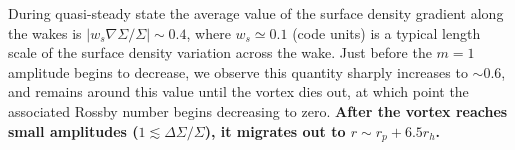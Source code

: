 During quasi-steady state the average value of the surface density gradient
along the wakes is $|w_s\nabla\Sigma/\Sigma| \sim 0.4 $, where 
$w_s\simeq0.1$ (code units) is a typical length scale of 
the surface density variation across the wake.   
Just before the $m=1$ amplitude begins to decrease, we observe this quantity
sharply increases to $ \sim 0.6 $, and remains around this value
until the vortex dies out, at which point the associated Rossby number
begins decreasing to zero. {\bf After the 
  vortex reaches small amplitudes ($1\lesssim\Delta\Sigma/\Sigma$), it 
  migrates out to $r\sim r_p+ 6.5 r_h$. 
}


